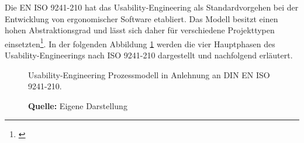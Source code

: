 Die EN ISO 9241-210 hat das Usability-Engineering als Standardvorgehen bei der Entwicklung von ergonomischer Software etabliert. Das Modell besitzt einen hohen Abstraktionsgrad und lässt sich daher für verschiedene Projekttypen einsetzten\footnote{\cite[vgl.][21]{Ecker2016}}. In der folgenden Abbildung \ref{fig:usabilityEngineeringVorgehensmodell} werden die vier Hauptphasen des Usability-Engineerings nach ISO 9241-210 dargestellt und nachfolgend erläutert.
\begin{figure}[H]
  \centering
  \caption{Usability-Engineering Prozessmodell in Anlehnung an DIN EN ISO 9241-210.}
  \caption*{\textbf{Quelle:} Eigene Darstellung}
  \label{fig:usabilityEngineeringVorgehensmodell}
\end{figure}
